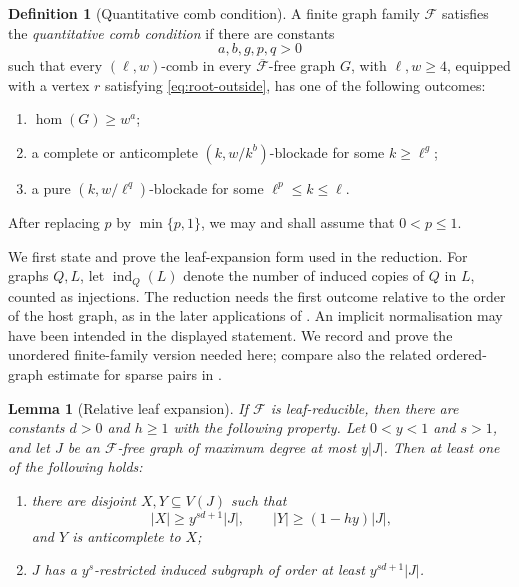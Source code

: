 \documentclass[11pt]{article}
\numberwithin{equation}{section}
\theoremstyle{plain}
\newtheorem{lemma}[theorem]{Lemma}
\theoremstyle{definition}
\newtheorem{definition}[theorem]{Definition}
\begin{document}
\begin{definition}[Quantitative comb condition]
\label{def:comb-hypothesis}
A finite graph family $\mathcal F$ satisfies the
\emph{quantitative comb condition} if there are constants
\[
                       a,b,g,p,q>0
\]
such that every $(\ell,w)$-comb in every
$\overline{\mathcal F}$-free graph $G$, with $\ell,w\geq4$, equipped with
a vertex $r$ satisfying \eqref{eq:root-outside}, has one of the
following outcomes:
\begin{enumerate}
\item[(H)] $\operatorname{hom}(G)\geq w^a$;
\item[(U)] a complete or anticomplete $(k,w/k^b)$-blockade for some
           $k\geq\ell^g$;
\item[(P)] a pure $(k,w/\ell^q)$-blockade for some
           $\ell^p\leq k\leq\ell$.
\end{enumerate}
After replacing $p$ by $\min\{p,1\}$, we may and shall assume that
$0<p\leq1$.
\end{definition}

We first state and prove the leaf-expansion form used in the
reduction.  For graphs $Q,L$, let $\operatorname{ind}_Q(L)$ denote the
number of induced copies of $Q$ in $L$, counted as injections.  The
reduction needs the first outcome relative to the order of the host
graph, as in the later applications of
\cite[Lemma~2.7]{HuangJuZhou2026}.  An implicit normalisation may have
been intended in the displayed statement.  We record and prove the
unordered finite-family version needed here; compare also the related
ordered-graph estimate for sparse pairs in
\cite[Lemma~5.1]{NguyenScottSeymourDensityIV}.

\begin{lemma}[Relative leaf expansion]
\label{lem:hjz-leaf-expansion}
If $\mathcal F$ is leaf-reducible, then there are constants $d>0$ and
$h\geq1$ with the following property.  Let $0<y<1$ and $s>1$, and let
$J$ be an $\mathcal F$-free graph of maximum degree at most $y|J|$.
Then at least one of the following holds:
\begin{enumerate}
\item there are disjoint $X,Y\subseteq V(J)$ such that
\[
 |X|\geq y^{sd+1}|J|,\qquad
 |Y|\geq(1-hy)|J|,
\]
and $Y$ is anticomplete to $X$;
\item $J$ has a $y^s$-restricted induced subgraph of order at least
      $y^{sd+1}|J|$.
\end{enumerate}
\end{lemma}
\end{document}
